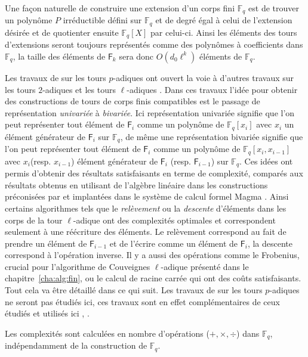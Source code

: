 \documentclass[10pt,a4paper]{book}
\theoremstyle{plain}
\theoremstyle{definition}
\theoremstyle{definition}
\theoremstyle{definition}
\theoremstyle{definition}
\theoremstyle{remark}
\theoremstyle{remark}
\theoremstyle{definition}
\begin{document}
Une façon naturelle de  construire une extension d'un corps fini $\mathbb{F}_q$ est de trouver un polynôme $P$ irréductible défini sur $\mathbb{F}_q$ et de degré égal à celui de l'extension désirée et de quotienter ensuite $\mathbb{F}_q[X]$ par celui-ci.
Ainsi les éléments des tours d'extensions seront toujours représentés comme des polynômes à coefficients dans $\mathbb{F}_q$, la taille des éléments de $\mathsf{F}_{k}$ sera donc $O(d_0\ell^k)$ éléments de $\mathbb{F}_q$. 

Les travaux de \cite{DeFeo-Shost'12} sur les tours $p$-adiques ont ouvert la voie à d'autres travaux sur les tours $2$-adiques \cite{Doliskani-Schost15} et les tours $\ell$-adiques \cite{DeFeo-Doliskani-Schost13}. Dans ces travaux l'idée pour obtenir des constructions de tours de corps finis compatibles est le passage de représentation \textit{univariée} à \textit{bivariée}. Ici représentation univariée signifie que l'on peut représenter tout élément de $\mathsf{F}_i$ comme un polynôme de $\mathbb{F}_q[x_i]$ avec $x_i$ un élément générateur de $\mathsf{F}_i$ sur $\mathbb{F}_q$, de même une représentation bivariée signifie que l'on peut représenter tout élément de $\mathsf{F}_i$ comme un polynôme de $\mathbb{F}_q[x_i, x_{i-1}]$ avec $x_i$(resp. $x_{i-1}$) élément générateur de $\mathsf{F}_i$ (resp. $\mathsf{F}_{i-1}$) sur $\mathbb{F}_q$. Ces idées ont permis d'obtenir des résultats satisfaisants en terme de complexité, comparés aux résultats obtenus en utilisant de l'algèbre linéaire dans les constructions préconisées par \cite{BosmaCS97} et implantées dans le système de calcul formel Magma \cite{magma97}. Ainsi certains algorithmes tels que le \textit{relèvement} ou la \textit{descente} d'éléments dans les corps de la tour $\ell$-adique ont des complexités optimales et correspondent seulement à une réécriture des éléments. Le relèvement correspond au fait de prendre un élément de $\mathsf{F}_{i-1}$ et de l'écrire comme un élément de $\mathsf{F}_i$, la descente correspond à l'opération inverse. Il y a aussi des opérations comme le Frobenius, crucial pour l'algorithme de Couveignes $\ell$-adique présenté dans le chapitre~\ref{cha:alg:fin}, ou le calcul de racine carrée qui ont des coûts satisfaisants. Tout cela va être détaillé dans ce qui suit. Les travaux de  \cite{DeFeo-Shost'12} sur les tours $p$-adiques ne seront pas étudiés ici, ces travaux sont en effet complémentaires de ceux étudiés et utilisés ici \cite{Doliskani-Schost15}, \cite{DeFeo-Doliskani-Schost13}.

Les complexités sont calculées en nombre d'opérations ($+, \times,\div$) dans $\mathbb{F}_q$, indépendamment de la construction de $\mathbb{F}_q$. 
\end{document}
